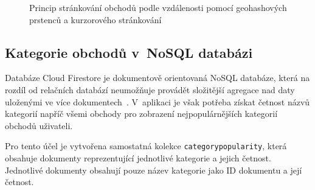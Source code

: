 \begin{figure}[htbp]
    \caption{Princip stránkování obchodů podle vzdálenosti pomocí geohashových prstenců a kurzorového stránkování}
    \label{fig:geo-paging-diagram}
\end{figure}

\FloatBarrier

\subsection[Kategorie obchodů v~NoSQL databázi]{Kategorie obchodů v~NoSQL databázi}
Databáze Cloud Firestore je dokumentově orientovaná NoSQL databáze, která na rozdíl od relačních databází neumožňuje provádět složitější agregace nad daty uloženými ve více dokumentech~\parencite{firebase_write_time_aggregation}.
V~aplikaci je však potřeba získat četnost názvů kategorií napříč všemi obchody pro zobrazení nejpopulárnějších kategorií obchodů uživateli.

Pro tento účel je vytvořena samostatná kolekce \texttt{category\-popu\-la\-ri\-ty}, která obsahuje dokumenty reprezentující jednotlivé kategorie a jejich četnost.
Jednotlivé dokumenty obsahují pouze název kategorie jako ID dokumentu a její četnost.

